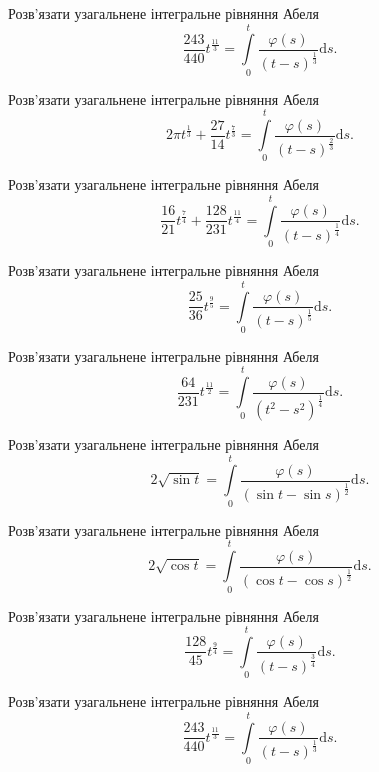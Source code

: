 \documentclass[12pt]{extarticle}
\begin{document}
\begin{Exercise}
Розв’язати узагальнене інтегральне рівняння Абеля \[\dfrac{243}{440} t^{\frac{11}{3}} = \int\limits_{0}^{t} \dfrac{\varphi(s)}{(t-s)^{\frac{1}{3}}} \mathrm{d}s.\]
\end{Exercise}

\begin{Exercise}
Розв’язати узагальнене інтегральне рівняння Абеля \[2\pi t^{\frac{1}{3}} + \dfrac{27}{14} t^{\frac{7}{3}} = \int\limits_{0}^{t} \dfrac{\varphi(s)}{(t-s)^{\frac{2}{3}}} \mathrm{d}s.\]
\end{Exercise}

\begin{Exercise}
Розв’язати узагальнене інтегральне рівняння Абеля \[\dfrac{16}{21} t^{\frac{7}{4}} + \dfrac{128}{231} t^{\frac{11}{4}} = \int\limits_{0}^{t} \dfrac{\varphi(s)}{(t-s)^{\frac{1}{4}}} \mathrm{d}s.\]
\end{Exercise}

\begin{Exercise}
Розв’язати узагальнене інтегральне рівняння Абеля \[\dfrac{25}{36} t^{\frac{9}{5}} = \int\limits_{0}^{t} \dfrac{\varphi(s)}{(t-s)^{\frac{1}{5}}} \mathrm{d}s.\]
\end{Exercise}

\begin{Exercise}
Розв’язати узагальнене інтегральне рівняння Абеля \[\dfrac{64}{231} t^{\frac{11}{2}} = \int\limits_{0}^{t} \dfrac{\varphi(s)}{(t^2-s^2)^{\frac{1}{4}}} \mathrm{d}s.\]
\end{Exercise}

\begin{Exercise}
Розв’язати узагальнене інтегральне рівняння Абеля \[2\sqrt{\sin t} = \int\limits_{0}^{t} \dfrac{\varphi(s)}{(\sin t - \sin s)^{\frac{1}{2}}} \mathrm{d}s.\]
\end{Exercise}

\begin{Exercise}
Розв’язати узагальнене інтегральне рівняння Абеля \[2\sqrt{\cos t} = \int\limits_{0}^{t} \dfrac{\varphi(s)}{(\cos t - \cos s)^{\frac{1}{2}}} \mathrm{d}s.\]
\end{Exercise}

\begin{Exercise}
Розв’язати узагальнене інтегральне рівняння Абеля \[\dfrac{128}{45} t^{\frac{9}{4}} = \int\limits_{0}^{t} \dfrac{\varphi(s)}{(t-s)^{\frac{3}{4}}} \mathrm{d}s.\]
\end{Exercise}

\begin{Exercise}
Розв’язати узагальнене інтегральне рівняння Абеля \[\dfrac{243}{440} t^{\frac{11}{3}} = \int\limits_{0}^{t} \dfrac{\varphi(s)}{(t-s)^{\frac{1}{3}}} \mathrm{d}s.\]
\end{Exercise}
\end{document}
